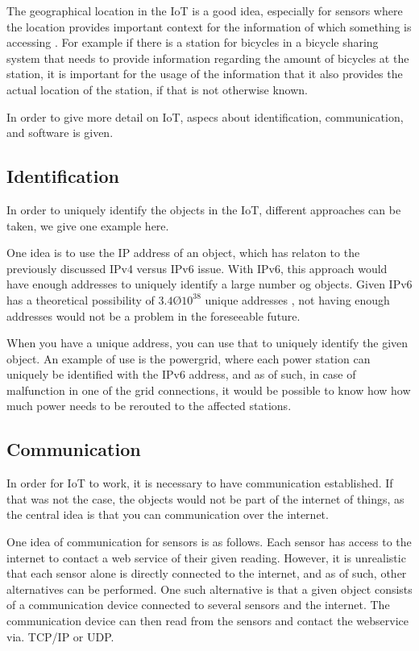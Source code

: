 The geographical location in the IoT is a good idea, especially for sensors where the location provides important context for the information of which something is accessing \citep{misc:locationMatters}.
For example if there is a station for bicycles in a bicycle sharing system that needs to provide information regarding the amount of bicycles at the station, it is important for the usage of the information that it also provides the actual location of the station, if that is not otherwise known.

In order to give more detail on IoT, aspecs about identification, communication, and software is given.

\subsection{Identification}
In order to uniquely identify the objects in the IoT, different approaches can be taken, we give one example here.

One idea is to use the IP address of an object, which has relaton to the previously discussed IPv4 versus IPv6 issue.
With IPv6, this approach would have enough addresses to uniquely identify a large number og objects.
Given IPv6 has a theoretical possibility of $3.4 Ø 10^38$ unique addresses \citep{misc:ipv6}, not having enough addresses would not be a problem in the foreseeable future.

When you have a unique address, you can use that to uniquely identify the given object.
An example of use is the powergrid, where each power station can uniquely be identified with the IPv6 address, and as of such, in case of malfunction in one of the grid connections, it would be possible to know how how much power needs to be rerouted to the affected stations.

\subsection{Communication}
In order for IoT to work, it is necessary to have communication established.
If that was not the case, the objects would not be part of the internet of things, as the central idea is that you can communication over the internet.

One idea of communication for sensors is as follows.
Each sensor has access to the internet to contact a web service of their given reading.
However, it is unrealistic that each sensor alone is directly connected to the internet, and as of such, other alternatives can be performed.
One such alternative is that a given object consists of a communication device connected to several sensors and the internet.
The communication device can then read from the sensors and contact the webservice via. TCP/IP or UDP.

